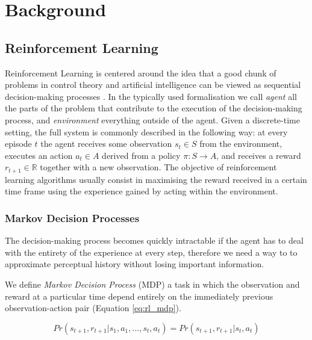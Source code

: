 \chapter{Background}


\section{Reinforcement Learning}

Reinforcement Learning is centered around the idea that a good chunk of problems
in control theory and artificial intelligence can be viewed as sequential
decision-making processes \citep{Sutton:1998:IRL:551283}. In the typically used
formalisation we call \emph{agent} all the parts of the problem that contribute
to the execution of the decision-making process, and \emph{environment}
everything outside of the agent. Given a discrete-time setting, the full system
is commonly described in the following way: at every episode $t$ the agent
receives some observation $s_t \in S$ from the environment, executes an action
$a_t \in A$ derived from a policy $\pi : S \rightarrow A$, and receives a reward
$r_{t+1} \in \mathbb{R}$ together with a new observation. The objective of
reinforcement learning algorithms usually consist in maximising the reward
received in a certain time frame using the experience gained by acting within
the environment.

\subsection{Markov Decision Processes}

The decision-making process becomes quickly intractable if the agent has to deal
with the entirety of the experience at every step, therefore we need a way to to
approximate perceptual history without losing important information.

We define \emph{Markov Decision Process} (MDP) a task in which the observation
and reward at a particular time depend entirely on the immediately previous
observation-action pair (Equation \ref{eq:rl_mdp}).

\begin{equation}
Pr(s_{t+1}, r_{t+1} | s_1, a_1, ... , s_t, a_t) = Pr(s_{t+1}, r_{t+1} |
s_t, a_t)
\label{eq:rl_mdp}
\end{equation}

